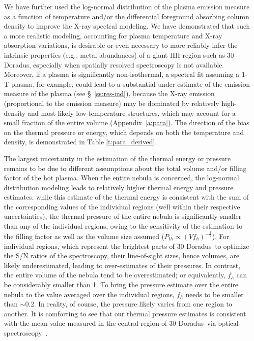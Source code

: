 \documentclass[usenatbib]{mnras}
\def\xs{30 Doradus}
\begin{document}
We have further used the log-normal distribution of the plasma emission measure as a function of temperature and/or the differential foreground absorbing column density to improve the X-ray spectral modeling. We have demonstrated that such a more realistic modeling, accounting for plasma temperature and X-ray absorption variations, is desirable or even necessary to more reliably infer the intrinsic properties (e.g., metal abundances) of a giant HII region such as \xs, especially when spatially resolved spectroscopy is not available. Moreover, if a plasma is significantly non-isothermal, a spectral fit assuming a 1-T plasma, for example, could lead to a substantial under-estimate of the emission measure of the plasma (see \S~\ref{ss:res-ind}), because the X-ray emission (proportional to the emission measure) may be dominated by relatively high-density and most likely low-temperature structures, which may account for a small fraction of the entire volume (Appendix~\ref{a:para}). The direction of the bias on the thermal pressure or energy, which depends on both the temperature and density, is demonstrated in Table \ref{t:para_derived}. 

The largest uncertainty in the estimation of the thermal energy or pressure remains to be due to different assumptions about the total volume and/or filling factor of the hot plasma.
When the entire nebula is concerned, the log-normal distribution modeling leads to relatively higher thermal energy and pressure estimates. while this estimate of the thermal energy is consistent with the sum of the corresponding values of the individual regions (well within their respective uncertainties),  the thermal pressure of the entire nebula is significantly smaller than any of the individual regions, owing to the sensitivity of the estimation to the filling factor as well as the volume size assumed ($P_{th}\propto (Vf_h)^{-\frac{1}{2}}$). For individual regions, which represent the brightest parts of  \xs\  to optimize the S/N ratios of the spectroscopy, their line-of-sight sizes, hence volumes, are likely underestimated, leading to over-estimates of their pressures. In contrast, the entire volume of the nebula tend to be overestimated; or equivalently, $f_h$  can be considerably smaller than 1. To bring the pressure estimate over the entire nebula to the value averaged over the individual regions, $f_h$  needs to be smaller than $\sim 0.2$.
In reality, of course, the pressure likely varies from one region to another. It is comforting to see that our thermal pressure estimates is consistent with the mean value measured in the central region of \xs\ via optical spectroscopy~\citep{Pellegrini11}. 
\end{document}
